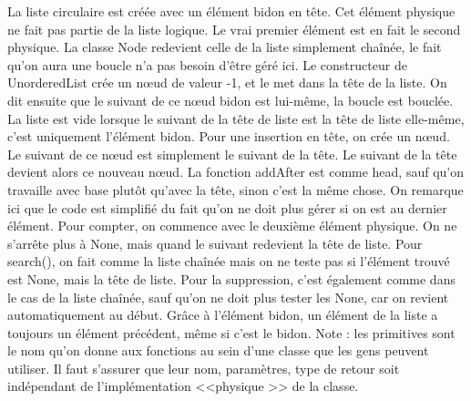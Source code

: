 \documentclass[10pt]{article}
\begin{document}
\newline \newline 
La liste circulaire est créée avec un élément bidon en tête. Cet élément physique ne fait pas partie de la liste logique. Le vrai premier élément est en fait le second physique. 
\newline \newline 
La classe Node redevient celle de la liste simplement chaînée, le fait qu'on aura une boucle n'a pas besoin d'être géré ici. Le constructeur de UnorderedList crée un nœud de valeur -1, et le met dans la tête de la liste. On dit ensuite que le suivant de ce nœud bidon est lui-même, la boucle est bouclée.
\newline \newline 
La liste est vide lorsque le suivant de la tête de liste est la tête de liste elle-même, c'est uniquement l'élément bidon.
\newline \newline 
Pour une insertion en tête, on crée un nœud. Le suivant de ce nœud est simplement le suivant de la tête. Le suivant de la tête devient alors ce nouveau nœud. 
\newline \newline 
La fonction addAfter est comme head, sauf qu'on travaille avec base plutôt qu'avec la tête, sinon c'est la même chose. On remarque ici que le code est simplifié du fait qu'on ne doit plus gérer si on est au dernier élément. 
\newline \newline 
Pour compter, on commence avec le deuxième élément physique. On ne s'arrête plus à None, mais quand le suivant redevient la tête de liste. Pour search(), on fait comme la liste chaînée mais on ne teste pas si l'élément trouvé est None, mais la tête de liste. 
\newline \newline 
Pour la suppression, c'est également comme dans le cas de la liste chaînée, sauf qu'on ne doit plus tester les None, car on revient automatiquement au début. Grâce à l'élément bidon, un élément de la liste a toujours un élément précédent, même si c'est le bidon. 
\newline \newline 
Note : les primitives sont le nom qu'on donne aux fonctions au sein d'une classe que les gens peuvent utiliser. Il faut s'assurer que leur nom, paramètres, type de retour soit indépendant de l'implémentation <<physique >> de la classe.
\end{document}
